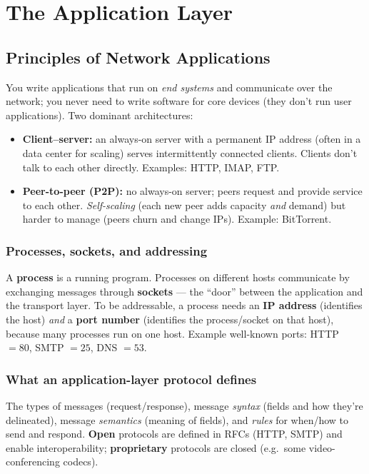 \documentclass[hidelinks]{article}
\begin{document}
\section{The Application Layer}

\subsection{Principles of Network Applications}

You write applications that run on \emph{end systems} and communicate over
the network; you never need to write software for core devices (they don't
run user applications). Two dominant architectures:

\begin{itemize}
    \item \textbf{Client--server:} an always-on server with a permanent IP
    address (often in a data center for scaling) serves intermittently
    connected clients. Clients don't talk to each other directly.
    Examples: HTTP, IMAP, FTP.
    \item \textbf{Peer-to-peer (P2P):} no always-on server; peers request and
    provide service to each other. \emph{Self-scaling} (each new peer adds
    capacity \emph{and} demand) but harder to manage (peers churn and change
    IPs). Example: BitTorrent.
\end{itemize}

\subsubsection{Processes, sockets, and addressing}
A \textbf{process} is a running program. Processes on different hosts
communicate by exchanging messages through \textbf{sockets} --- the
``door'' between the application and the transport layer. To be addressable,
a process needs an \textbf{IP address} (identifies the host) \emph{and} a
\textbf{port number} (identifies the process/socket on that host), because
many processes run on one host. Example well-known ports: HTTP $=80$,
SMTP $=25$, DNS $=53$.

\subsubsection{What an application-layer protocol defines}
The types of messages (request/response), message \emph{syntax} (fields and
how they're delineated), message \emph{semantics} (meaning of fields), and
\emph{rules} for when/how to send and respond. \textbf{Open} protocols are
defined in RFCs (HTTP, SMTP) and enable interoperability;
\textbf{proprietary} protocols are closed (e.g.\ some video-conferencing
codecs).
\end{document}
